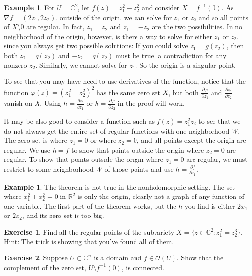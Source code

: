 \documentclass[12pt,openany]{book}
\newcommand{\C}{{\mathbb{C}}}
\newcommand{\R}{{\mathbb{R}}}
\newcommand{\sO}{{\mathscr{O}}}
\theoremstyle{plain}
\theoremstyle{remark}
\theoremstyle{definition}
\newenvironment{exbox}{%
    \def\FrameCommand{\vrule width 1pt \relax\hspace{10pt}}%
    \MakeFramed {\advance \hsize -\width \FrameRestore}%
}{%
    \endMakeFramed
}
\theoremstyle{exercise}
\newtheorem{exercise}{Exercise}[section]
\theoremstyle{example}
\newtheorem{example}[thm]{Example}
\begin{document}
\begin{example}
For $U = \C^2$,
let $f(z) = z_1^2-z_2^2$ and consider $X = f^{-1}(0)$. As $\nabla f =
(2z_1,2z_2)$,
outside of the origin, we can solve for $z_1$ or $z_2$ and so
all points of $X \setminus 0$ are regular.  In fact,
$z_1 = z_2$ and $z_1 = -z_2$ are the two possibilities.
In no neighborhood of the origin, however, is there a way to solve for either
$z_1$ or $z_2$, since you always get two possible solutions:  If you could
solve $z_1 = g(z_2)$, then both $z_2 = g(z_2)$ and $-z_2 = g(z_2)$ must be
true, a contradiction for any nonzero $z_2$.  Similarly,
we cannot solve for $z_1$.
So the origin is a singular point.

To see that you may have need to use derivatives of the function, notice
that the function $\varphi(z) = {(z_1^2-z_2^2)}^2$ has the same zero set $X$,
but both
$\frac{\partial \varphi}{\partial z_1}$ and
$\frac{\partial \varphi}{\partial z_2}$ vanish on $X$.  Using
$h= \frac{\partial \varphi}{\partial z_1}$ or
$h= \frac{\partial \varphi}{\partial z_2}$ in the proof will work.

It may be also good to consider a function such as $f(z) = z_1^2z_2$ to see
that we do not always get the entire set of regular functions with one
neighborhood $W$.  The
zero set is where $z_1=0$ or where $z_2=0$, and all points except the origin
are regular.  We use $h=f$ to show that points outside the origin
where $z_2=0$ are regular.
To show that points outside the origin
where $z_1=0$ are regular, we must restrict to some neighborhood $W$
of those points and use $h = \frac{\partial f}{\partial z_1}$.
\end{example}

\begin{example}
The theorem is not true in the nonholomorphic setting.  The set
where $x_1^2 +  x_2^2 = 0$ in $\R^2$ is only the origin, clearly not a graph
of any function of one variable.  The first part of the theorem works, but
the $h$ you find is either $2x_1$ or $2x_2$, and its zero set is too big.
\end{example}

\begin{exbox}
\begin{exercise}
Find all the regular points of the subvariety
$X = \bigl\{ z \in \C^2 : z_1^2 = z_2^3 \bigr\}$.
Hint: The trick is showing that you've found all of them.
\end{exercise}

\begin{exercise} \label{exercise:connectedcomplement}
Suppose $U \subset \C^n$ is a domain and $f \in \sO(U)$.
Show that the complement of the zero set, $U \setminus f^{-1}(0)$, is
connected.
\end{exercise}
\end{exbox}
\end{document}
